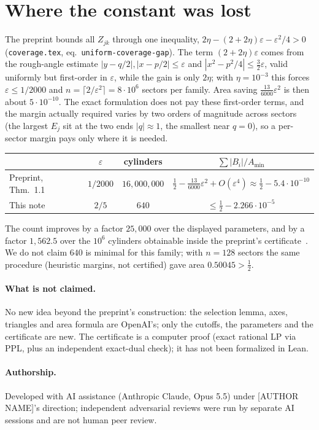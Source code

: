 \documentclass[11pt]{amsart}
\theoremstyle{remark}
\newcommand{\eps}{\varepsilon}
\begin{document}
\section{Where the constant was lost}
The preprint bounds all $Z_{jk}$ through one inequality,
$2\eta-(2+2\eta)\eps-\eps^2/4>0$ (\texttt{coverage.tex}, eq.~\texttt{uniform-coverage-gap}). The term $(2+2\eta)\eps$ comes from the
rough-angle estimate $|y-q/2|,|x-p/2|\le\eps$ and $|x^2-p^2/4|\le\frac32\eps$, valid uniformly but
first-order in $\eps$, while the gain is only $2\eta$; with $\eta=10^{-3}$ this forces
$\eps\le1/2000$ and $n=\lceil2/\eps^2\rceil=8\cdot10^6$ sectors per family. Area saving
$\frac{13}{6000}\eps^2$ is then about $5\cdot10^{-10}$. The exact formulation does not pay these first-order terms, and the margin actually required varies
by two orders of magnitude across sectors (the largest $E_j$ sit at the two ends $|q|\approx1$, the
smallest near $q=0$), so a per-sector margin pays only where it is needed.
\begin{center}
\begin{tabular}{lccc}
\toprule
 & $\eps$ & cylinders & $\sum|B_i|/A_{\min}$\\
\midrule
Preprint, Thm.~1.1 & $1/2000$ & $16{,}000{,}000$ & $\frac12-\frac{13}{6000}\eps^2+O(\eps^4)\approx\frac12-5.4\cdot10^{-10}$\\
This note & $2/5$ & $640$ & $\le\frac12-2.266\cdot10^{-5}$\\
\bottomrule
\end{tabular}
\end{center}
The count improves by a factor $25{,}000$ over the displayed parameters, and by a factor
$1{,}562.5$ over the $10^6$ cylinders obtainable inside the preprint's certificate~\cite{SupsupNMR}. We do not claim $640$ is minimal for this family; with
$n=128$ sectors the same procedure (heuristic margins, not certified) gave area $0.50045>\frac12$.

\paragraph{What is not claimed.} No new idea beyond the preprint's construction: the selection lemma,
axes, triangles and area formula are OpenAI's; only the cutoffs, the parameters and the
certificate are new. The certificate is a computer proof (exact rational LP via PPL, plus an
independent exact-dual check); it has not been formalized in Lean.

\paragraph{Authorship.} \sloppy Developed with AI assistance (Anthropic Claude, Opus 5.5) under
[AUTHOR NAME]'s direction; independent adversarial reviews were run by separate AI sessions and are
not human peer review.
\end{document}
